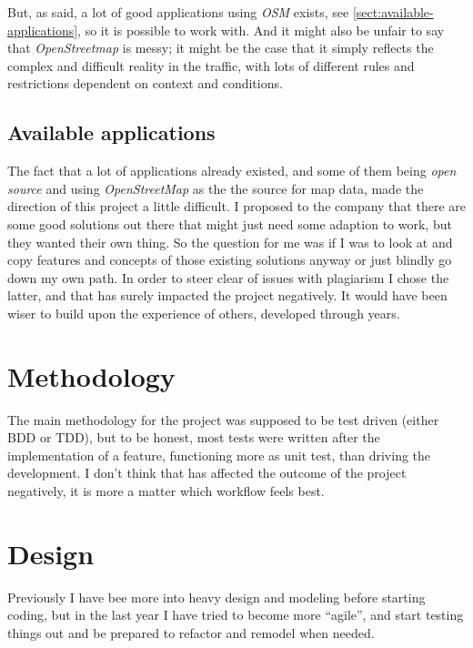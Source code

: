 \documentclass[../main.tex]{subfiles}
\begin{document}
But, as said, a lot of good applications using \textit{OSM} exists, see \ref{sect:available-applications}, so it is possible to work with. And it might also be unfair to say that \textit{OpenStreetmap} is messy; it might be the case that it simply reflects the complex and difficult reality in the traffic, with lots of different rules and restrictions dependent on context and conditions.

\subsection{Available applications}
The fact that a lot of applications already existed, and some of them being \textit{open source} and using \textit{OpenStreetMap} as the the source for map data, made the direction of this project a little difficult. I proposed to the company that there are some good solutions out there that might just need some adaption to work, but they wanted their own thing. So the question for me was if I was to look at and copy features and concepts of those existing solutions anyway or just blindly go down my own path. In order to steer clear of issues with plagiarism I chose the latter, and that has surely impacted the project negatively. It would have been wiser to build upon the experience of others, developed through years.


\section{Methodology}
The main methodology for the project was supposed to be test driven (either BDD or TDD), but to be honest, most tests were written after the implementation of a feature, functioning more as unit test, than driving the development. I don't think that has affected the outcome of the project negatively, it is more a matter which workflow feels best.


\section{Design}
Previously I have bee more into heavy design and modeling before starting coding, but in the last year I have tried to become more ``agile'', and start testing things out and be prepared to refactor and remodel when needed.
\end{document}
